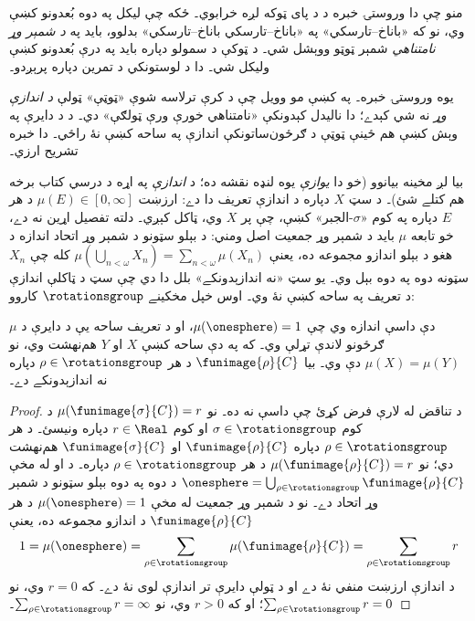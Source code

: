 \documentclass[../../../include/open-logic-section]{subfiles}
\begin{document}
منو چې دا وروستۍ خبره د  د پای ټوکه
لږه خرابوي۔ ځکه چې ليکل په دوه بُعدونو کښې وي، نو که
«باناخ--تارسکي» په «باناخ--تارسکي باناخ--تارسکي»
بدلوو، بايد په \emph{د شمېر وړ نامتناهي} شمېر ټوټو
ووېشل شي۔ د ټوکې د سمولو دپاره بايد په درې بُعدونو
کښې وليکل شي۔ دا د لوستونکي د تمرين دپاره پرېږدو۔

يوه وروستۍ خبره۔ په  کښې مو وويل
چې د کرې ترلاسه شوې «ټوټې» ټولې \emph{د اندازې وړ}
نه شي کېدے؛ دا ناليدل کېدونکې «نامتناهي خورې ورې
ټولګې» دي۔ د  د دايرې په وېش کښې هم
ځينې ټوټې د ګرځون‌ساتونکې اندازې په ساحه کښې نۀ راځي۔ دا خبره تشريح
ارزي۔

بيا لږ مخينه بيانوو (خو دا \emph{يوازې} يوه لنډه نقشه
ده؛ د \emph{اندازې} په اړه د درسي کتاب برخه هم کتلے شئ)۔
د سټ $X$ دپاره د اندازې تعريف دا دے: ارزښت
$\mu(E) \in [0,\infty]$ د هر $E$ دپاره په کوم
«$\sigma$-الجبر» کښې، چې پر $X$ وي، ټاکل کېږي۔
دلته تفصيل اړين نه دے،
خو تابعه $\mu$ بايد د شمېر وړ جمعيت اصل ومني: د
بېلو سټونو د شمېر وړ اتحاد اندازه د هغو د بېلو اندازو
مجموعه ده، يعنې
$\mu(\bigcup_{n < \omega} X_n) = \sum_{n < \omega}\mu(X_n)$
کله چې $X_n$ سټونه دوه په دوه بېل وي۔ يو سټ «نه
اندازېدونکے» بلل دا دي چې سټ د ټاکلې اندازې د
تعريف په ساحه کښې نۀ وي۔ اوس خپل مخکينے $\rotationsgroup$ کاروو:

\begin{cor}[ويتالي]
$\mu$ دې داسې اندازه وي چې $\mu(\onesphere) = 1$،
او د تعريف ساحه يې د دايرې د ګرځونو لاندې تړلې وي۔
که په دې ساحه کښې $X$ او $Y$ هم‌نهشت وي، نو
$\mu(X) = \mu(Y)$ دې وي۔
بيا $\funimage{\rho}{C}$ د
هر $\rho \in \rotationsgroup$ دپاره نه اندازېدونکے دے۔
\end{cor}

\begin{proof}
د تناقض له لارې فرض کړئ چې داسې نه ده۔ نو
$\mu(\funimage{\sigma}{C}) = r$ د کوم
$\sigma \in \rotationsgroup$ او کوم $r \in \Real$
دپاره ونيسئ۔ د هر $\rho \in \rotationsgroup$ دپاره
$\funimage{\rho}{C}$ او $\funimage{\sigma}{C}$
هم‌نهشت دي؛ نو $\mu(\funimage{\rho}{C}) = r$
د هر $\rho \in \rotationsgroup$ دپاره۔ د  او
 له مخې
$\onesphere = \bigcup_{\rho \in \rotationsgroup}\funimage{\rho}{C}$
د دوه په دوه بېلو سټونو د شمېر وړ اتحاد دے۔ نو د شمېر
وړ جمعيت له مخې $\mu(\onesphere) = 1$ د هر
$\funimage{\rho}{C}$ د اندازو مجموعه ده، يعنې
\[
	1 = \mu(\onesphere) = \sum_{\rho \in \rotationsgroup}\mu(\funimage{\rho}{C}) = \sum_{\rho \in \rotationsgroup}r
\]
د اندازې ارزښت منفي نۀ دے او د ټولې دايرې تر اندازې
لوی نۀ دے۔ که $r = 0$ وي، نو $\sum_{\rho \in \rotationsgroup}r = 0$؛
او که $r > 0$ وي، نو
$\sum_{\rho \in \rotationsgroup}r = \infty$۔
\end{proof}
\end{document}
